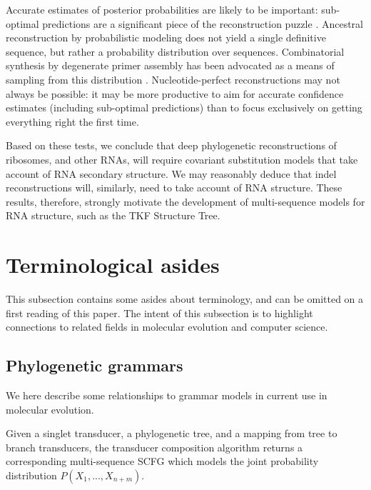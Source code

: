 \documentclass[10pt]{article}
\begin{document}
Accurate estimates of posterior probabilities are likely to be important:
sub-optimal predictions are a significant piece of the reconstruction puzzle \cite{WilliamsEtAl2006,PollockChang2007,ChangEtAl2007}.
Ancestral reconstruction by probabilistic modeling does not yield a single definitive sequence, but rather a probability distribution over sequences.
Combinatorial synthesis by degenerate primer assembly has been advocated as a means of sampling from this distribution \cite{Gaucher2007}.
Nucleotide-perfect reconstructions may not always be possible:
it may be more productive to aim for accurate confidence estimates
(including sub-optimal predictions)
than to focus exclusively on getting everything right the first time.

Based on these tests, we conclude that deep phylogenetic reconstructions of ribosomes, and other RNAs, will require covariant substitution models that take account of RNA secondary structure.
We may reasonably deduce that indel reconstructions will, similarly, need to take account of RNA structure.
These results, therefore, strongly motivate the development of multi-sequence models for RNA structure, such as the TKF Structure Tree.



\section{Terminological asides}

This subsection contains some asides about terminology,
and can be omitted on a first reading of this paper.
The intent of this subsection is to highlight connections to related fields
in molecular evolution and computer science.

\subsection{Phylogenetic grammars}

We here describe some relationships to grammar models in current use in molecular evolution.

Given a singlet transducer, a phylogenetic tree, and a mapping from tree to branch transducers,
the transducer composition algorithm returns a corresponding multi-sequence SCFG
which models the joint probability distribution $P(X_1 , ... , X_{n+m})$.
\end{document}
